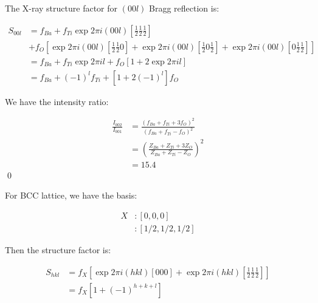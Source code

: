 \documentclass[12pt]{article}
\begin{document}


The X-ray structure factor for $(00l)$ Bragg reflection is:

\begin{equation}
    \begin{split}
        S_{00l} &= f_{Ba} + f_{Ti} \exp{2\pi i (00l) [\frac{1}{2} \frac{1}{2} \frac{1}{2}]} \\
        &+ f_{O} \left[ \exp{2\pi i (00l) [\frac{1}{2} \frac{1}{2} 0]} + \exp{2\pi i (00l) [\frac{1}{2} 0 \frac{1}{2}]} + \exp{2\pi i (00l) [0 \frac{1}{2} \frac{1}{2}]} \right] \\
        &= f_{Ba} + f_{Ti} \exp{2\pi i l} + f_{O} \left[ 1 + 2 \exp{2\pi i l} \right] \\
        &= f_{Ba} + (-1)^{l} f_{Ti} + \left[ 1 + 2(-1)^{l} \right] f_{O}
    \end{split}
\end{equation}

We have the intensity ratio:

\begin{equation}
    \begin{split}
        \frac{I_{002}}{I_{001}} &= \frac{(f_{Ba} + f_{Ti} + 3f_{O})^{2}}{(f_{Ba} + f_{Ti} - f_{O})^{2}} \\
        &= \left( \frac{Z_{Ba} + Z_{Ti} + 3Z_{O}}{Z_{Ba} + Z_{Ti} - Z_{O}} \right)^{2} \\
        &= 15.4
    \end{split}
\end{equation}
\qed




For BCC lattice, we have the basis:

\begin{equation}
    \begin{split}
        X & : [0, 0, 0] \\
        & : [1/2, 1/2, 1/2]
    \end{split}
\end{equation}

Then the structure factor is:

\begin{equation}
    \begin{split}
        S_{hkl} &= f_{X} \left[ \exp{2\pi i (hkl) [0 0 0]} + \exp{2\pi i (hkl) [\frac{1}{2} \frac{1}{2} \frac{1}{2}]} \right] \\
        &= f_{X} \left[ 1 + (-1)^{h+k+l} \right]
    \end{split}
\end{equation}
\end{document}

